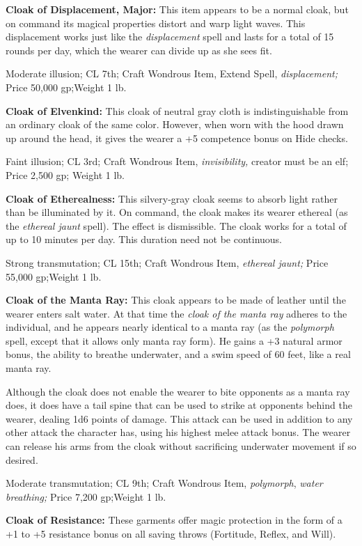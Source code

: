 \documentclass{article}
\begin{document}
\textbf{Cloak of Displacement, Major:} This item appears to be a normal cloak, 
but on command its magical properties distort and warp light waves. This displacement 
works just like the \textit{displacement }spell and lasts for a total of 15 rounds 
per day, which the wearer can divide up as she sees fit.

Moderate illusion; CL 7th; Craft Wondrous Item, Extend Spell, \textit{displacement; 
}Price 50,000 gp;Weight 1 lb.

\textbf{Cloak of Elvenkind:} This cloak of neutral gray cloth is indistinguishable 
from an ordinary cloak of the same color. However, when worn with the hood drawn 
up around the head, it gives the wearer a +5 competence bonus on Hide checks.

Faint illusion; CL 3rd; Craft Wondrous Item, \textit{invisibility, }creator must 
be an elf; Price 2,500 gp; Weight 1 lb.

\textbf{Cloak of Etherealness:} This silvery-gray cloak seems to absorb light rather 
than be illuminated by it. On command, the cloak makes its wearer ethereal (as 
the \textit{ethereal jaunt }spell). The effect is dismissible. The cloak works 
for a total of up to 10 minutes per day. This duration need not be continuous.

Strong transmutation; CL 15th; Craft Wondrous Item, \textit{ethereal jaunt; }Price 
55,000 gp;Weight 1 lb.

\textbf{Cloak of the Manta Ray:} This cloak appears to be made of leather until 
the wearer enters salt water. At that time the \textit{cloak of the manta ray }adheres 
to the individual, and he appears nearly identical to a manta ray (as the \textit{polymorph 
}spell, except that it allows only manta ray form). He gains a +3 natural armor 
bonus, the ability to breathe underwater, and a swim speed of 60 feet, like a real 
manta ray.

Although the cloak does not enable the wearer to bite opponents as a manta ray 
does, it does have a tail spine that can be used to strike at opponents behind 
the wearer, dealing 1d6 points of damage. This attack can be used in addition to 
any other attack the character has, using his highest melee attack bonus. The wearer 
can release his arms from the cloak without sacrificing underwater movement if 
so desired.

Moderate transmutation; CL 9th; Craft Wondrous Item, \textit{polymorph}, \textit{water 
breathing; }Price 7,200 gp;Weight 1 lb.

\textbf{Cloak of Resistance:} These garments offer magic protection in the form 
of a +1 to +5 resistance bonus on all saving throws (Fortitude, Reflex, and Will).
\end{document}
